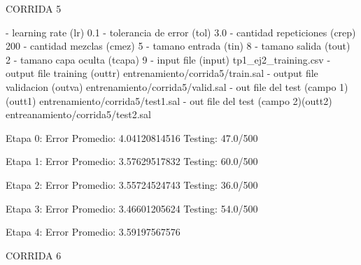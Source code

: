 CORRIDA 5

  - learning rate              (lr)         0.1
  - tolerancia de error        (tol)        3.0
  - cantidad repeticiones      (crep)       200
  - cantidad mezclas           (cmez)       5
  - tamano entrada             (tin)        8
  - tamano salida              (tout)       2
  - tamano capa oculta         (tcapa)      9
  - input file                 (input)      tp1_ej2_training.csv
  - output file training       (outtr)      entrenamiento/corrida5/train.sal
  - output file validacion     (outva)      entrenamiento/corrida5/valid.sal
  - out file del test (campo 1)(outt1)      entrenamiento/corrida5/test1.sal
  - out file del test (campo 2)(outt2)      entreanamiento/corrida5/test2.sal

Etapa 0:
      Error Promedio: 4.04120814516
      Testing: 47.0/500

Etapa 1:
      Error Promedio: 3.57629517832
      Testing: 60.0/500

Etapa 2:
      Error Promedio: 3.55724524743
      Testing: 36.0/500

Etapa 3:
      Error Promedio: 3.46601205624
      Testing: 54.0/500

Etapa 4:
      Error Promedio: 3.59197567576



CORRIDA 6